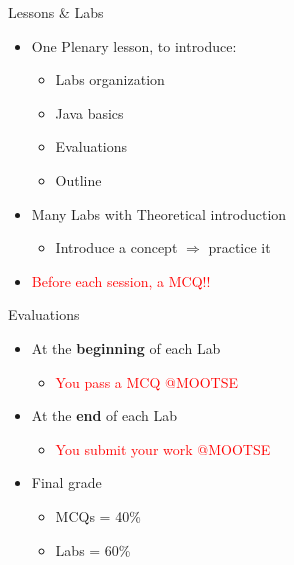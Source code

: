\documentclass[English,t,%
hyperref={%
    pdftitle={FISA-DE2 OOP in Java},%
    pdfauthor={Guillaume Muller},%
    pdfsubject={OOP in Java},%
    pdfkeywords={OOP, Java}%
    },%
xcolor={pdftex,svgnames} %
]{beamer}
\begin{document}
\begin{frame}{Lessons \& Labs}

  \begin{itemize}
%
    \item One Plenary lesson, to introduce:
    \vspace{.5em}
    \begin{itemize}
      \item Labs organization
      \item Java basics
      \item Evaluations
      \item Outline
    \end{itemize}
%
    \vspace{2em}
    \item Many Labs with Theoretical introduction
    \vspace{.5em}
    \begin{itemize}
      \item Introduce a concept $\Rightarrow$ practice it
    \end{itemize}
%
    \vspace{2em}
    \item \textcolor{red}{Before each session, a MCQ!!}
%
  \end{itemize}

\end{frame}


\begin{frame}{Evaluations}

  \begin{itemize}
    \item At the \textbf{beginning} of each Lab
    \begin{itemize}
      \item \textcolor{red}{You pass a MCQ @MOOTSE}
    \end{itemize}
%
    \vspace{2em}
    \item At the \textbf{end} of each Lab
    \begin{itemize}
      \item \textcolor{red}{You submit your work @MOOTSE}
    \end{itemize}
%
    \vspace{2em}
    \item Final grade
    \begin{itemize}
      \item MCQs = 40\%
      \item Labs = 60\%
    \end{itemize}
%
  \end{itemize}

\end{frame}
\end{document}
